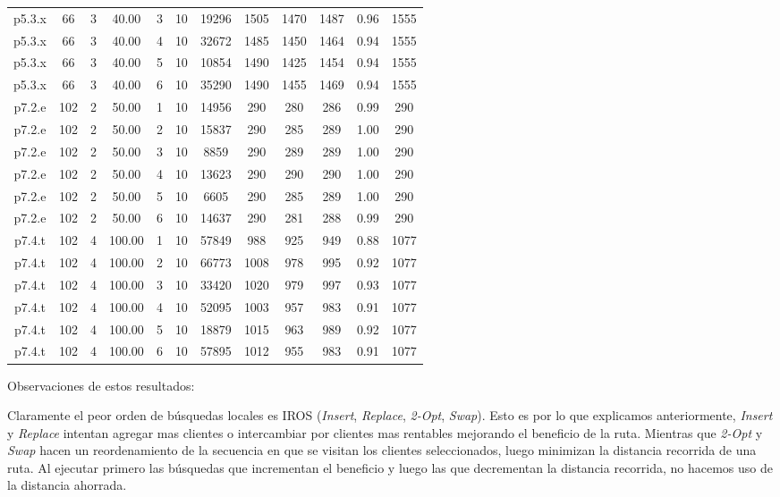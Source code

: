 \begin{center}
\begin{tabular}{ |c|c|c|c|c|c|c|c|c|c|c|c| }
p5.3.x & 66 & 3 & 40.00 & 3 & 10 & 19296 & 1505 & 1470 & 1487 & 0.96 & 1555  \\
p5.3.x & 66 & 3 & 40.00 & 4 & 10 & 32672 & 1485 & 1450 & 1464 & 0.94 & 1555  \\
p5.3.x & 66 & 3 & 40.00 & 5 & 10 & 10854 & 1490 & 1425 & 1454 & 0.94 & 1555  \\
p5.3.x & 66 & 3 & 40.00 & 6 & 10 & 35290 & 1490 & 1455 & 1469 & 0.94 & 1555  \\
p7.2.e & 102 & 2 & 50.00 & 1 & 10 & 14956 & 290 & 280 & 286 & 0.99 & 290  \\
p7.2.e & 102 & 2 & 50.00 & 2 & 10 & 15837 & 290 & 285 & 289 & 1.00 & 290  \\
p7.2.e & 102 & 2 & 50.00 & 3 & 10 & 8859 & 290 & 289 & 289 & 1.00 & 290  \\
p7.2.e & 102 & 2 & 50.00 & 4 & 10 & 13623 & 290 & 290 & 290 & 1.00 & 290  \\
p7.2.e & 102 & 2 & 50.00 & 5 & 10 & 6605 & 290 & 285 & 289 & 1.00 & 290  \\
p7.2.e & 102 & 2 & 50.00 & 6 & 10 & 14637 & 290 & 281 & 288 & 0.99 & 290  \\
p7.4.t & 102 & 4 & 100.00 & 1 & 10 & 57849 & 988 & 925 & 949 & 0.88 & 1077  \\
p7.4.t & 102 & 4 & 100.00 & 2 & 10 & 66773 & 1008 & 978 & 995 & 0.92 & 1077  \\
p7.4.t & 102 & 4 & 100.00 & 3 & 10 & 33420 & 1020 & 979 & 997 & 0.93 & 1077  \\
p7.4.t & 102 & 4 & 100.00 & 4 & 10 & 52095 & 1003 & 957 & 983 & 0.91 & 1077  \\
p7.4.t & 102 & 4 & 100.00 & 5 & 10 & 18879 & 1015 & 963 & 989 & 0.92 & 1077  \\
p7.4.t & 102 & 4 & 100.00 & 6 & 10 & 57895 & 1012 & 955 & 983 & 0.91 & 1077  \\
\hline
\end{tabular}
\end{center}

\bigskip

Observaciones de estos resultados:

\bigskip

Claramente el peor orden de búsquedas locales es IROS (\textit{Insert}, \textit{Replace}, \textit{2-Opt}, \textit{Swap}). Esto es por lo que explicamos anteriormente, \textit{Insert} y \textit{Replace} intentan agregar mas clientes o intercambiar por clientes mas rentables mejorando el beneficio de la ruta. Mientras que \textit{2-Opt} y \textit{Swap} hacen un reordenamiento de la secuencia en que se visitan los clientes seleccionados, luego minimizan la distancia recorrida de una ruta. Al ejecutar primero las búsquedas que incrementan el beneficio y luego las que decrementan la distancia recorrida, no hacemos uso de la distancia ahorrada.

